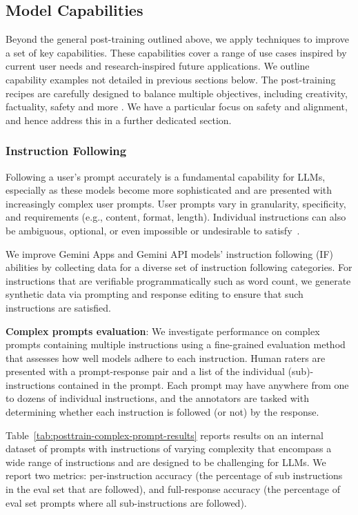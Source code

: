 \subsection{Model Capabilities}

Beyond the general post-training outlined above, we apply techniques to improve a set of key capabilities. These capabilities cover a range of use cases inspired by current user needs and research-inspired future applications. We outline capability examples not detailed in previous sections below. The post-training recipes are carefully designed to balance multiple objectives, including creativity, factuality, safety and more \citep{bai2022constitutional, thoppilan2022lamda}. We have a particular focus on safety and alignment, and hence address this in a further dedicated section.

\subsubsection{Instruction Following}

Following a user’s prompt accurately is a fundamental capability for LLMs, especially as these models become more sophisticated and are presented with increasingly complex user prompts. User prompts vary in granularity, specificity, and requirements (e.g., content, format, length). Individual instructions can also be ambiguous, optional, or even impossible or undesirable to satisfy~\citep{he2023can, xu2023wizardlm}.

We improve Gemini Apps and Gemini API models’ instruction following (IF) abilities by collecting data for a diverse set of instruction following categories. For instructions that are verifiable programmatically such as word count, we generate synthetic data via prompting and response editing to ensure that such instructions are satisfied.

\textbf{Complex prompts evaluation}: We investigate performance on complex prompts containing multiple instructions using a fine-grained evaluation method that assesses how well models adhere to each instruction. Human raters are presented with a prompt-response pair and a list of the individual (sub)-instructions contained in the prompt. Each prompt may have anywhere from one to dozens of individual instructions, and the annotators are tasked with determining whether each instruction is followed (or not) by the response.

Table~\ref{tab:posttrain-complex-prompt-results} reports results on an internal dataset of prompts with instructions of varying complexity that encompass a wide range of instructions and are designed to be challenging for LLMs. We report two metrics: per-instruction accuracy (the percentage of sub instructions in the eval set that are followed), and full-response accuracy (the percentage of eval set prompts where all sub-instructions are followed).


